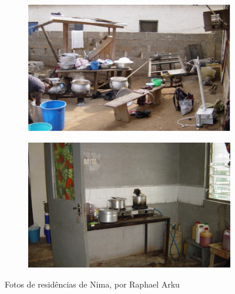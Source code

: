 \begin{figure}[H]
  \begin{subfigure}[b]{0.5\textwidth}
    \includegraphics[width=\textwidth]{../inputs/images/zheng/nima1.jpg}
    \caption{}
  \end{subfigure}%
  \begin{subfigure}[b]{0.5\textwidth}
    \includegraphics[width=\textwidth]{../inputs/images/zheng/nima2.jpg}
    \caption{}
  \end{subfigure}
  \caption{Fotos de residências de Nima, por Raphael Arku \label{fig:nima}}
\end{figure}
